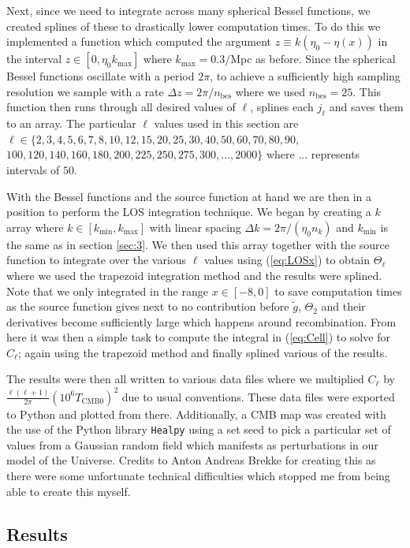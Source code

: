 \documentclass[%
reprint,
 amsmath,amssymb,
 aps,
]{revtex4-2}
\begin{document}
Next, since we need to integrate across many spherical Bessel functions, we created splines of these to drastically lower computation times. To do this we implemented a function which computed the argument $z\equiv k(\eta_0-\eta(x))$ in the interval $z\in[0,\eta_0 k_\text{max}]$ where $k_\text{max}=0.3/$Mpc as before. Since the spherical Bessel functions oscillate with a period $2\pi$, to achieve a sufficiently high sampling resolution we sample with a rate $\Delta z=2\pi/n_\text{bes}$ where we used $n_\text{bes}=25$. This function then runs through all desired values of $\ell$, splines each $j_\ell$ and saves them to an array. The particular $\ell$ values used in this section are $\ell\in\{2, 3, 4, 5, 6, 7, 8, 10, 12, 15,
20, 25, 30, 40, 50, 60, 70, 80, 90, $ $100, 120, 140, 160, 180, 200, 225, 250, 275, 300, ..., 2000\}$ where $...$ represents intervals of $50$.

With the Bessel functions and the source function at hand we are then in a position to perform the LOS integration technique. We began by creating a $k$ array where $k\in[k_\text{min},k_\text{max}]$ with linear spacing $\Delta k=2\pi/(\eta_0n_k)$ and $k_\text{min}$ is the same as in section \ref{sec:3}. We then used this array together with the source function to integrate over the various $\ell$ values using (\ref{eq:LOSx}) to obtain $\Theta_\ell$ where we used the trapezoid integration method and the results were splined. Note that we only integrated in the range $x\in[-8,0]$ to save computation times as the source function gives next to no contribution before $\tilde{g}$, $\Theta_2$ and their derivatives become sufficiently large which happens around recombination. From here it was then a simple task to compute the integral in (\ref{eq:Cell}) to solve for $C_\ell$; again using the trapezoid method and finally splined various of the results.

The results were then all written to various data files where we multiplied $C_\ell$ by $\frac{\ell(\ell+1)}{2\pi}(10^6 T_{\text{CMB}0})^2$ due to usual conventions. These data files were exported to Python and plotted from there. Additionally, a CMB map was created with the use of the Python library \texttt{Healpy} using a set seed to pick a particular set of values from a Gaussian random field which manifests as perturbations in our model of the Universe. Credits to Anton Andreas Brekke for creating this as there were some unfortunate technical difficulties which stopped me from being able to create this myself.

\subsection{Results}
\end{document}
